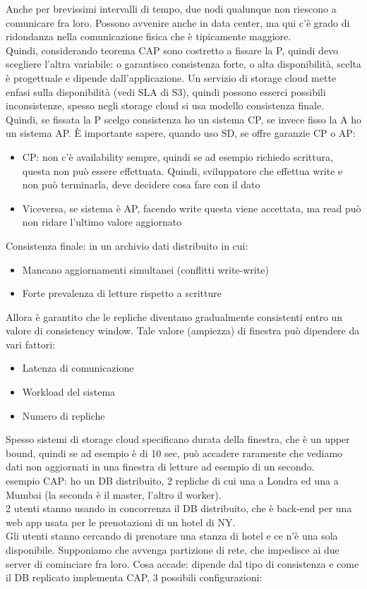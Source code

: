 \documentclass[16px]{article}
\begin{document}
Anche per brevissimi intervalli di tempo, due nodi qualunque non riescono a comunicare fra loro. Possono avvenire anche in data center, ma qui c'è grado di ridondanza nella comunicazione fisica che è tipicamente maggiore.\\ Quindi, considerando teorema CAP sono costretto a fissare la P, quindi devo scegliere l'altra variabile: o garantisco consistenza forte, o alta disponibilità, scelta è progettuale e dipende dall'applicazione. Un servizio di storage cloud mette enfasi sulla disponibilità (vedi SLA di S3), quindi possono esserci possibili inconsistenze, spesso negli storage cloud si usa modello consistenza finale.\\ Quindi, se fissata la P scelgo consistenza ho un sistema CP, se invece fisso la A ho un sistema AP. È importante sapere, quando uso SD, se offre garanzie CP o AP:
\begin{itemize}
\item CP: non c'è availability sempre, quindi se ad esempio richiedo scrittura, questa non può essere effettuata. Quindi, sviluppatore che effettua write e non può terminarla, deve decidere cosa fare con il dato
\item Viceversa, se sistema è AP, facendo write questa viene accettata, ma read può non ridare l'ultimo valore aggiornato
\end{itemize}
Consistenza finale: in un archivio dati distribuito in cui:
\begin{itemize}
\item Mancano aggiornamenti simultanei (conflitti write-write)
\item Forte prevalenza di letture rispetto a scritture
\end{itemize}
Allora è garantito che le repliche diventano gradualmente consistenti entro un valore di consistency window. Tale valore (ampiezza) di finestra può dipendere da vari fattori:
\begin{itemize}
\item Latenza di comunicazione
\item Workload del sistema
\item Numero di repliche
\end{itemize}
Spesso sistemi di storage cloud specificano durata della finestra, che è un upper bound, quindi se ad esempio è di 10 sec, può accadere raramente che vediamo dati non aggiornati in una finestra di letture ad esempio di un secondo.\\ esempio CAP: ho un DB distribuito, 2 repliche di cui una a Londra ed una a Mumbai (la seconda è il master, l'altro il worker).\\ 2 utenti stanno usando in concorrenza il DB distribuito, che è back-end per una web app usata per le prenotazioni di un hotel di NY.\\ Gli utenti stanno cercando di prenotare una stanza di hotel e ce n'è una sola disponibile. Supponiamo che avvenga partizione di rete, che impedisce ai due server di cominciare fra loro. Cosa accade: dipende dal tipo di consistenza e come il DB replicato implementa CAP, 3 possibili configurazioni:
\end{document}
